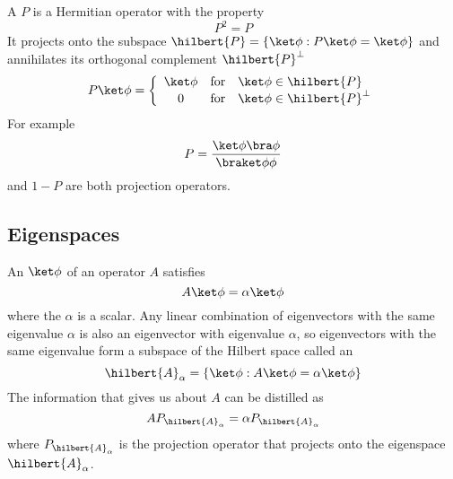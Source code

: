 \documentclass[a4paper,12pt]{report}
\begin{document}
A  $P$ is a Hermitian operator with the property
\begin{equation}
P^2 = P
\end{equation}
It projects onto the subspace $\hilbert{P} = \{ \ket\phi : P \ket\phi = \ket\phi \}$
and annihilates its orthogonal complement $\hilbert{P}^\perp$
\begin{equation}
P \ket\phi =
\left\{
\begin{array}{ccl}
\ket\phi & \textrm{for} & \ket\phi \in \hilbert{P}
\\
0 & \textrm{for} & \ket\phi \in \hilbert{P}^\perp
\end{array}
\right.
\end{equation}
For example
\begin{equation}
P = \frac{ \ket\phi \bra\phi }{ \braket\phi\phi }
\end{equation}
and $1 - P$ are both projection operators.

\subsection{Eigenspaces}

An  $\ket\phi$ of an operator $A$ satisfies
\begin{equation} \label{eigenvector}
A \ket\phi = \alpha \ket\phi
\end{equation}
where the  $\alpha$ is a scalar.
Any linear combination of eigenvectors with the same eigenvalue $\alpha$ is also an eigenvector with eigenvalue $\alpha$, so eigenvectors with the same eigenvalue form a subspace of the Hilbert space called an 
\begin{equation}
\hilbert{A}_\alpha = \left\{ \ket\phi : A \ket\phi = \alpha \ket\phi \right\}
\end{equation}
The information that  gives us about $A$ can be distilled as
\begin{equation} \label{eseq}
A P_{\hilbert{A}_\alpha} = \alpha P_{\hilbert{A}_\alpha}
\end{equation}
where $P_{\hilbert{A}_\alpha}$ is the projection operator that projects onto the eigenspace $\hilbert{A}_\alpha$.
\end{document}
